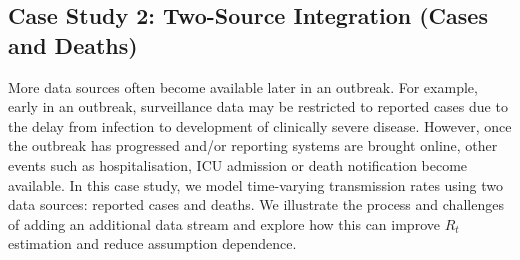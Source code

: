 \documentclass{article}
\begin{document}
\subsection{Case Study 2: Two-Source Integration (Cases and Deaths)}

More data sources often become available later in an outbreak. For example, early in an outbreak, surveillance data may be restricted to reported cases due to the delay from infection to development of clinically severe disease. However, once the outbreak has progressed and/or reporting systems are brought online, other events such as hospitalisation, ICU admission or death notification become available. In this case study, we model time-varying transmission rates using two data sources: reported cases and deaths. We illustrate the process and challenges of adding an additional data stream and explore how this can improve $R_t$ estimation and reduce assumption dependence.
\end{document}
